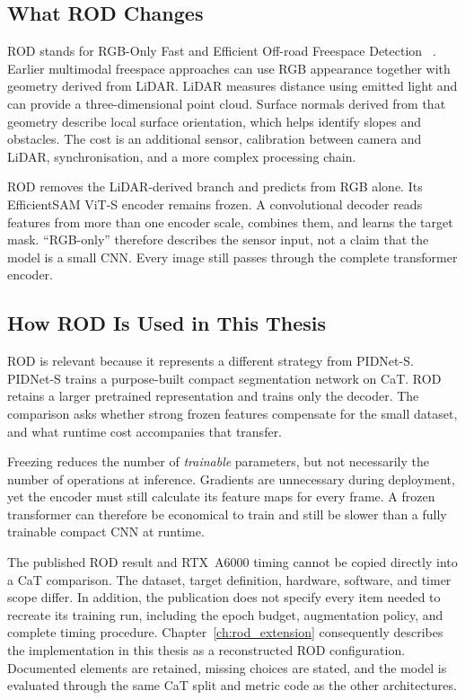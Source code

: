 \subsection{What ROD Changes}

ROD stands for RGB-Only Fast and Efficient Off-road Freespace Detection
~\cite{sun2025rod}. Earlier multimodal freespace approaches can use RGB
appearance together with geometry derived from LiDAR. LiDAR measures distance
using emitted light and can provide a three-dimensional point cloud. Surface
normals derived from that geometry describe local surface orientation, which
helps identify slopes and obstacles. The cost is an additional sensor,
calibration between camera and LiDAR, synchronisation, and a more complex
processing chain.

ROD removes the LiDAR-derived branch and predicts from RGB alone. Its
EfficientSAM ViT-S encoder remains frozen. A convolutional decoder reads
features from more than one encoder scale, combines them, and learns the target
mask. ``RGB-only'' therefore describes the sensor input, not a claim that the
model is a small CNN. Every image still passes through the complete transformer
encoder.

\subsection{How ROD Is Used in This Thesis}

ROD is relevant because it represents a different strategy from PIDNet-S.
PIDNet-S trains a purpose-built compact segmentation network on CaT. ROD
retains a larger pretrained representation and trains only the decoder. The
comparison asks whether strong frozen features compensate for the small
dataset, and what runtime cost accompanies that transfer.

Freezing reduces the number of \emph{trainable} parameters, but not necessarily
the number of operations at inference. Gradients are unnecessary during
deployment, yet the encoder must still calculate its feature maps for every
frame. A frozen transformer can therefore be economical to train and still be
slower than a fully trainable compact CNN at runtime.

The published ROD result and RTX~A6000 timing cannot be copied directly into a
CaT comparison. The dataset, target definition, hardware, software, and timer
scope differ. In addition, the publication does not specify every item needed
to recreate its training run, including the epoch budget, augmentation policy,
and complete timing procedure. Chapter~\ref{ch:rod_extension} consequently
describes the implementation in this thesis as a reconstructed ROD
configuration. Documented elements are retained, missing choices are stated,
and the model is evaluated through the same CaT split and metric code as the
other architectures.

